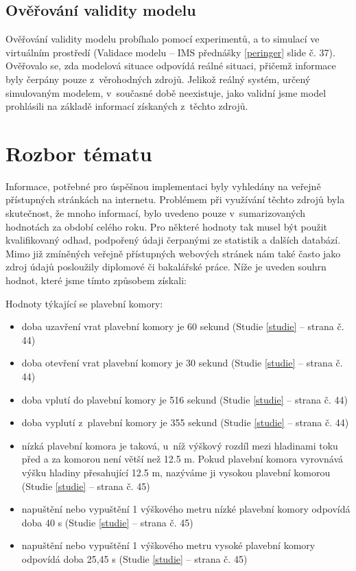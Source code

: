 \documentclass[11pt,a4paper]{article}
\begin{document}
    \subsection{Ověřování validity modelu}

      Ověřování validity modelu probíhalo pomocí experimentů, a to simulací ve
      virtuálním prostředí (Validace modelu -- IMS přednášky \ref{peringer}
      slide č. 37). Ověřovalo se, zda modelová situace odpovídá reálné situaci,
      přičemž informace byly čerpány pouze z~věrohodných zdrojů.
      Jelikož reálný systém, určený simulovaným modelem, v~současné době
      neexistuje, jako validní jsme model prohlásili na základě
      informací získaných z~těchto zdrojů.

  \section{Rozbor tématu}

    Informace, potřebné pro úspěšnou implementaci byly vyhledány na veřejně
    přístupných stránkách na internetu. Problémem při využívání těchto zdrojů
    byla skutečnost, že mnoho informací, bylo uvedeno pouze v~sumarizovaných
    hodnotách za období celého roku.  Pro některé hodnoty tak musel být použit
    kvalifikovaný odhad, podpořený údaji čerpanými ze statistik a dalších
    databází. Mimo již zmíněných veřejně přístupných webových stránek nám také
    často jako zdroj údajů posloužily diplomové či bakalářské práce. Níže je
    uveden souhrn hodnot, které jsme tímto způsobem získali:

    \noindent
    Hodnoty týkající se plavební komory:

    \begin{itemize}
      \item doba uzavření vrat plavební komory je 60 sekund (Studie \ref{studie} -- strana č. 44)
      \item doba otevření vrat plavební komory je 30 sekund (Studie \ref{studie} -- strana č. 44)
      \item doba vplutí do plavební komory je 516 sekund (Studie \ref{studie} -- strana č. 44)
      \item doba vyplutí z~plavební komory je 355 sekund (Studie \ref{studie} -- strana č. 44)
      \item nízká plavební komora je taková, u~níž výškový rozdíl mezi
            hladinami toku před a za komorou není větší než 12.5 m.
            Pokud plavební komora vyrovnává výšku hladiny přesahující 12.5 m,
            nazýváme ji vysokou plavební komorou (Studie \ref{studie} -- strana č. 45)
      \item napuštění nebo vypuštění 1 výškového metru nízké plavební komory
            odpovídá doba 40 s (Studie \ref{studie} -- strana č. 45)
      \item napuštění nebo vypuštění 1 výškového metru  vysoké plavební komory
            odpovídá doba 25,45 s (Studie \ref{studie} -- strana č. 45)
    \end{itemize}
\end{document}
